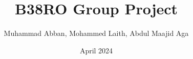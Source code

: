 \documentclass{report}
\begin{document}
\title{B38RO Group Project}
\author{Muhammad Abban, Mohammed Laith, Abdul Maajid Aga}
\date{April 2024}
\maketitle

\tableofcontents
\end{document}
